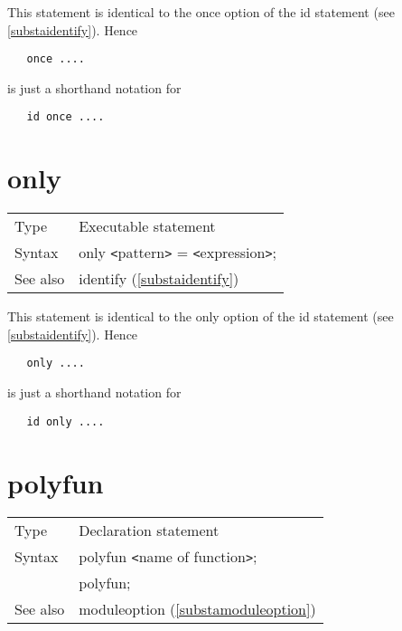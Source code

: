 \noindent This statement is identical to the once option of the 
id statement (see \ref{substaidentify}). Hence
\begin{verbatim}
   once ....
\end{verbatim}
is just a shorthand notation for
\begin{verbatim}
   id once ....
\end{verbatim}
\vspace{10mm}

 
\section{only}
\label{substaonly}

\noindent \begin{tabular}{ll}
Type & Executable statement\\
Syntax & only {\tt<}pattern{\tt>} = {\tt<}expression{\tt>};
\\ See also & identify (\ref{substaidentify})
\end{tabular} \vspace{4mm}

\noindent This statement is identical to the only option of the 
id statement (see \ref{substaidentify}). Hence
\begin{verbatim}
   only ....
\end{verbatim}
is just a shorthand notation for
\begin{verbatim}
   id only ....
\end{verbatim}
\vspace{10mm}


\section{polyfun}
\label{substapolyfun}

\noindent \begin{tabular}{ll}
Type & Declaration statement\\
Syntax & polyfun {\tt<}name of function{\tt>}; \\
       & polyfun;
\\ See also & moduleoption (\ref{substamoduleoption})
\end{tabular}\vspace{4mm}

